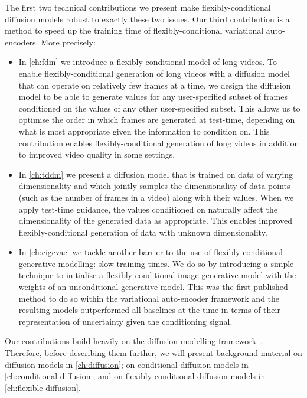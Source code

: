 The first two technical contributions we present make flexibly-conditional diffusion models robust to exactly these two issues. Our third contribution is a method to speed up the training time of flexibly-conditional variational auto-encoders. More precisely:
\begin{itemize}
    \item In \cref{ch:fdm} we introduce a flexibly-conditional model of long videos. To enable flexibly-conditional generation of long videos with a diffusion model that can operate on relatively few frames at a time, we design the diffusion model to be able to generate values for any user-specified subset of frames conditioned on the values of any other user-specified subset. This allows us to optimise the order in which frames are generated at test-time, depending on what is most appropriate given the information to condition on. This contribution enables flexibly-conditional generation of long videos in addition to improved video quality in some settings.
    \item In \cref{ch:tddm} we present a diffusion model that is trained on data of varying dimensionality and which jointly samples the dimensionality of data points (such as the number of frames in a video) along with their values. When we apply test-time guidance, the values conditioned on naturally affect the dimensionality of the generated data as appropriate. This enables improved flexibly-conditional generation of data with unknown dimensionality.
    \item In \cref{ch:cigcvae} we tackle another barrier to the use of flexibly-conditional generative modelling: slow training times. We do so by introducing a simple technique to initialise a flexibly-conditional image generative model with the weights of an unconditional generative model. This was the first published method to do so within the variational auto-encoder framework and the resulting models outperformed all baselines at the time in terms of their representation of uncertainty given the conditioning signal.
\end{itemize}
Our contributions build heavily on the diffusion modelling framework~\citep{sohl2015deep,ho2020denoising}. Therefore, before describing them further, we will present background material on diffusion models in \cref{ch:diffusion}; on conditional diffusion models in \cref{ch:conditional-diffusion}; and on flexibly-conditional diffusion models in \cref{ch:flexible-diffusion}.



